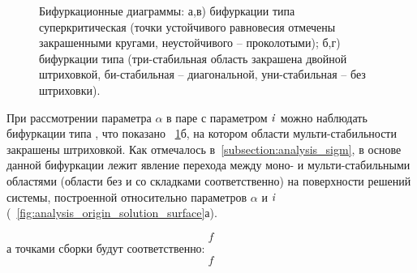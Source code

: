 \begin{figure}[t]
    \caption{Бифуркационные диаграммы: а,в) бифуркации типа суперкритическая  (точки устойчивого равновесия отмечены закрашенными кругами, неустойчивого -- проколотыми); б,г) бифуркации типа  (три-стабильная область закрашена двойной штриховкой, би-стабильная -- диагональной, уни-стабильная -- без штриховки).}
    \label{fig:analysis_origin_bifurcations}
\end{figure}

При рассмотрении параметра $\alpha$ в паре с параметром $\mathit{i}$ можно наблюдать бифуркации типа , что показано \onfigure~\ref{fig:analysis_origin_bifurcations}б, на котором области мульти-стабильности закрашены штриховкой. Как отмечалось в~\autoref{subsection:analysis_sigm}, в основе данной бифуркации лежит явление перехода между моно- и мульти-стабильными областями (области без и со складками соответственно) на поверхности решений системы, построенной относительно параметров $\alpha$ и $\mathit{i}$ (\seefigure~\ref{fig:analysis_origin_solution_surface}а).



\begin{equation}
    f
\end{equation}
а точками сборки будут соответственно:
\begin{equation}
    f
\end{equation}

